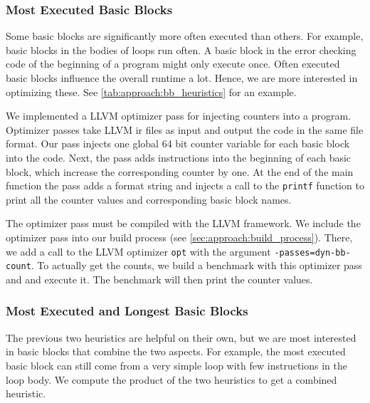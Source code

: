 \subsubsection{Most Executed Basic Blocks}
Some basic blocks are significantly more often executed than others.
For example, basic blocks in the bodies of loops run often.
A basic block in the error checking code of the beginning of a program might only execute once.
Often executed basic blocks influence the overall runtime a lot.
Hence, we are more interested in optimizing these.
See \cref{tab:approach:bb_heuristics} for an example.

We implemented a LLVM optimizer pass for injecting counters into a program.
Optimizer passes take LLVM \ac{ir} files as input and output the code in the same file format.
Our pass injects one global 64 bit counter variable for each basic block into the code.
Next, the pass adds instructions into the beginning of each basic block, which increase the corresponding counter by one.
At the end of the main function the pass adds a format string and injects a call to the \lstinline{printf} function to print all the counter values and corresponding basic block names.

The optimizer pass must be compiled with the LLVM framework.
We include the optimizer pass into our build process (see \cref{sec:approach:build_process}).
There, we add a call to the LLVM optimizer \lstinline{opt} with the argument \mbox{\lstinline{-passes=dyn-bb-count}}.
To actually get the counts, we build a benchmark with this optimizer pass and and execute it.
The benchmark will then print the counter values.

\subsubsection{Most Executed and Longest Basic Blocks}
The previous two heuristics are helpful on their own, but we are most interested in basic blocks that combine the two aspects.
For example, the most executed basic block can still come from a very simple loop with few instructions in the loop body.
We compute the product of the two heuristics to get a combined heuristic.

